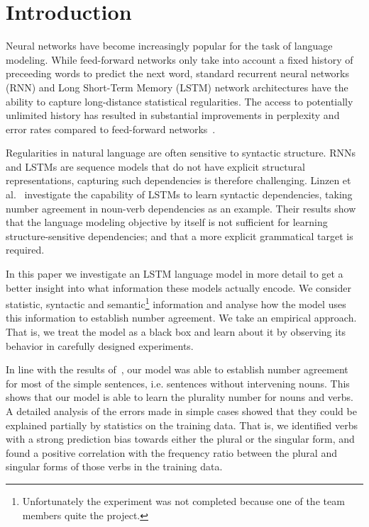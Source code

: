 \section{Introduction}

Neural networks have become increasingly popular
for the task of language modeling.
While feed-forward networks only take into account
a fixed history of preceeding words to predict the next word,
standard recurrent neural networks (RNN) and 
Long Short-Term Memory (LSTM) network architectures
have the ability to capture long-distance statistical regularities.
The access to potentially unlimited history 
has resulted in substantial improvements 
in perplexity and error rates
compared to feed-forward networks~\citep{Mikolov2010,Sundermeyer2013}. 

Regularities in natural language are often sensitive to syntactic structure.
RNNs and LSTMs are sequence models that do not have explicit
structural representations,
capturing such dependencies is therefore challenging.
Linzen et al.~\cite{Linzen2016} investigate the capability
of LSTMs to learn syntactic dependencies, taking
number agreement in noun-verb dependencies as an example.
Their results show that the language modeling objective by itself
is not sufficient for learning structure-sensitive dependencies;
and that a more explicit grammatical target is required.

In this paper we investigate an LSTM language model
in more detail to get a better insight into what 
information these models actually encode.
We consider statistic, syntactic and 
semantic\footnote{
Unfortunately the experiment was not completed
because one of the team members quite the project.
} information and analyse how the model uses this information
to establish number agreement. 
We take an empirical approach.
That is, we treat the model as a black box
and learn about it by observing its behavior
in carefully designed experiments.

In line with the results of~\citep{Linzen2016},
our model was able to establish number agreement 
for most of the simple sentences,
i.e. sentences without intervening nouns.
This shows that our model is able to learn the 
plurality number for nouns and verbs.
A detailed analysis of the errors made in simple cases
showed that they could be explained partially by 
statistics on the training data.
That is, we identified verbs with a strong 
prediction bias towards
either the plural or the singular form,
and found a positive correlation with the
frequency ratio between the plural and singular forms
of those verbs in the training data.
%

